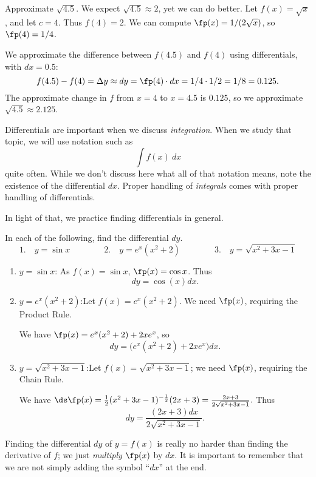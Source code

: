 \begin{example}\label{ex_diffal2}
Approximate $\sqrt{4.5}$.
\solution
We expect $\sqrt{4.5} \approx 2$, yet we can do better. Let $f(x) = \sqrt{x}$, and let $c=4$. Thus $f(4) = 2$. We can compute $\fp(x) = 1/(2\sqrt{x})$, so $\fp(4) = 1/4$. 

We approximate the difference between $f(4.5)$ and $f(4)$ using differentials, with $dx = 0.5$:
\[f(4.5)-f(4) = \Delta y \approx dy = \fp(4)\cdot dx = 1/4 \cdot 1/2 = 1/8 = 0.125.\]
The approximate change in $f$ from $x=4$ to $x=4.5$ is $0.125$, so we approximate $\sqrt{4.5} \approx 2.125$.
\end{example}

Differentials are important when we discuss \textit{integration}. When we study that topic, we will use notation such as
\[\int f(x)\ dx\]
quite often. While we don't discuss here what all of that notation means, note the existence of the differential $dx$. Proper handling of \textit{integrals} comes with proper handling of differentials. 

In light of that, we practice finding differentials in general.

\begin{example}\label{ex_diffal3}
In each of the following, find the differential $dy$.
\[
\text{1.}\quad y = \sin x\qquad\qquad
\text{2.}\quad y = e^x(x^2+2)\qquad\qquad
\text{3.}\quad y = \sqrt{x^2+3x-1}
\]
\solution
\begin{enumerate}
	\item	$y = \sin x$:	\quad As $f(x) = \sin x$, $\fp(x) = \cos x$. Thus
	\[dy = \cos (x)dx.\]
	\item	$y = e^x(x^2+2)$:\quad Let $f(x) = e^x(x^2+2)$. We need $\fp(x)$, requiring the Product Rule. 

We have $\fp(x) = e^x(x^2+2) + 2xe^x$, so
\[dy = \big(e^x(x^2+2) + 2xe^x\big)dx.\]

	\item	$y = \sqrt{x^2+3x-1}$:\quad	Let $f(x) = \sqrt{x^2+3x-1}$; we need $\fp(x)$, requiring the Chain Rule.

We have $\ds \fp(x) = \frac{1}{2}(x^2+3x-1)^{-\frac12}(2x+3) = \frac{2x+3}{2\sqrt{x^2+3x-1}}.$ Thus 
\[dy = \frac{(2x+3)dx}{2\sqrt{x^2+3x-1}}.\]
\end{enumerate}
\end{example}

Finding the differential $dy$ of $y=f(x)$ is really no harder than finding the derivative of $f$; we just \textit{multiply} $\fp(x)$ by $dx$. It is important to remember that we are not simply adding the symbol ``$dx$'' at the end.\\


